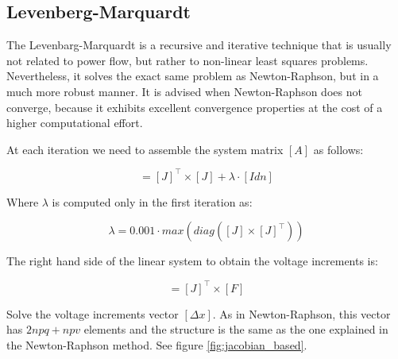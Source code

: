 \documentclass[nols,a4paper,twoside,symmetric,notoc,fleqn]{tufte-book}
\begin{document}
\newpage
\subsection{Levenberg-Marquardt} \label{LM-Method}

The Levenbarg-Marquardt is a recursive and iterative technique that is usually not related to power flow, but rather to non-linear least squares problems. Nevertheless, it solves the exact same problem as Newton-Raphson, but in a much more robust manner. It is advised when Newton-Raphson does not converge, because it exhibits excellent convergence properties at the cost of a higher computational effort.


At each iteration we need to assemble the system matrix $[A]$ as follows:
%
%
%


\begin{equation}
[A] = [J]^\top \times [J] + \lambda \cdot [Idn]
\label{eq:lm_A}
\end{equation}


Where $\lambda$ is computed only in the first iteration as:

\begin{equation}
\lambda = 0.001 \cdot max(diag([J] \times [J]^\top))
\end{equation}

The right hand side of the linear system to obtain the voltage increments is:


\begin{equation}
[rhs] = [J]^\top \times [F]
\label{eq:lm_rhs}
\end{equation}


Solve the voltage increments vector $[\Delta x]$. As in Newton-Raphson, this vector has $2npq+npv$ elements and the structure is the same as the one explained in the Newton-Raphson method. See figure \ref{fig:jacobian_based}.

\end{document}
